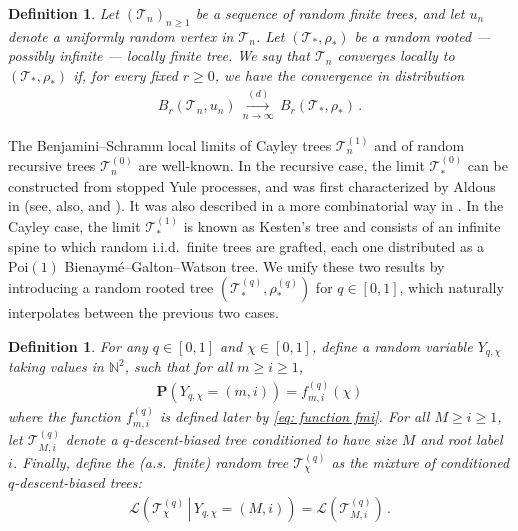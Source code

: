 \documentclass{article}
\newtheorem{definition}[theorem]{Definition}
\theoremstyle{remark}
\newcommand{\bN}{\mathbb{N}}
\newcommand{\cv}[1]{\,\underset{#1}{\longrightarrow}\,}
\newcommand{\cT}{\mathcal{T}}
\newcommand{\prob}[1]{\mathbf{P}{\left(#1\right)}}
\newcommand{\Law}[1]{\mathcal{L}{\left(#1\right)}}
\newcommand{\Lawcond}[2]{\mathcal{L}{\left(\left.#1 \,\right\vert\, #2\right)}}
\begin{document}
\begin{definition}
\label{def:bs local limit}
Let $(\cT_n)_{n \geq 1}$ be a sequence of random finite trees, and let $u_n$ denote a uniformly random vertex in $\cT_n$. 
Let $(\cT_*,\rho_*)$ be a random rooted --- possibly infinite --- locally finite tree. 
We say that $\cT_n$ converges locally to $(\cT_*,\rho_*)$ if, for every fixed $r \geq 0$, we have the convergence in distribution
\begin{align*}
B_r(\cT_n,u_n) \overset{(d)}{\cv{n\to\infty}} B_r(\cT_*,\rho_*) \,.
\end{align*}
\end{definition}

The Benjamini--Schramm local limits of Cayley trees $\cT_n^{(1)}$ and of random recursive trees $\cT_n^{(0)}$ are well-known.
In the recursive case, the limit $\cT_*^{(0)}$ can be constructed from stopped Yule processes, and was first characterized by Aldous in \cite{Aldous_1991} (see, also, \cite[Example 6.1]{Holmgren_Janson_2017} and \cite{Contat_Laulin_2025}). It was also described in a more combinatorial way in \cite[Appendix A]{Dadedzi_Wagner_2024}.
In the Cayley case, the limit $\cT_*^{(1)}$ is known as Kesten's tree \cite{Kesten_1986} and consists of an infinite spine to which random i.i.d.\ finite trees are grafted, each one distributed as a $\mathrm{Poi}(1)$ Bienaymé--Galton--Watson tree.
We unify these two results by introducing a random rooted tree $(\cT_*^{(q)}, \rho_*^{(q)})$ for $q\in[0,1]$, which naturally interpolates between the previous two cases.

\begin{definition}%
\label{def:grafted trees}
    For any $q\in[0,1]$ and $\chi \in [0,1]$, define a random variable $Y_{q,\chi}$ taking values in $\bN^2$, such that for all $m \geq i \geq 1$,
    \begin{align*}
    \prob{Y_{q,\chi} = (m,i)} = f_{m,i}^{(q)}(\chi)
    \end{align*}
    where the function $f_{m,i}^{(q)}$ is defined later by \eqref{eq: function fmi}.
    For all $M\ge i \ge 1$, let $\cT^{(q)}_{M,i}$ denote a $q$-descent-biased tree conditioned to have size $M$ and root label $i$. 
    Finally, define the (a.s.\ finite) random tree $\cT^{(q)}_\chi$ as the mixture of conditioned $q$-descent-biased trees:
    \begin{align*}
    \Lawcond{\cT^{(q)}_\chi }{ Y_{q,\chi}=(M,i) } = \Law{ \cT^{(q)}_{M,i} } \,.
    \end{align*}
\end{definition}
\end{document}
